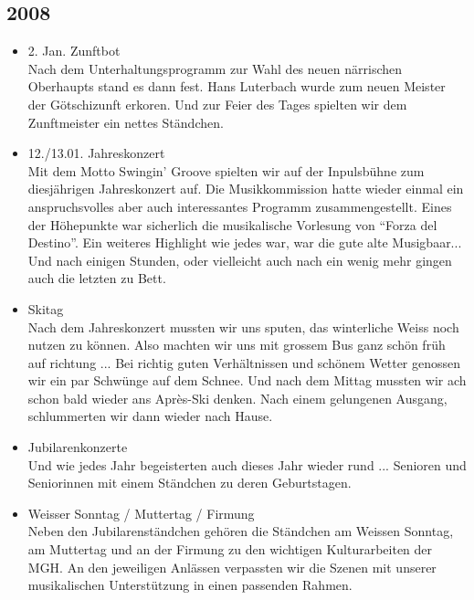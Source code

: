 \subsection*{2008}

\begin{history}


    \begin{itemize}

        \item 2. Jan. Zunftbot\\
              Nach dem Unterhaltungsprogramm zur Wahl des neuen närrischen Oberhaupts
              stand es dann fest. Hans Luterbach wurde zum neuen Meister der
              Götschizunft erkoren. Und zur Feier des Tages spielten wir dem
              Zunftmeister ein nettes Ständchen.

        \item 12./13.01. Jahreskonzert\\

              Mit dem Motto Swingin' Groove spielten wir auf der Inpulsbühne zum
              diesjährigen Jahreskonzert auf. Die Musikkommission hatte wieder einmal
              ein anspruchsvolles aber auch interessantes Programm zusammengestellt.
              Eines der Höhepunkte war sicherlich die musikalische Vorlesung von
              \enquote{Forza del Destino}. Ein weiteres Highlight wie jedes war, war
              die gute alte Musigbaar... Und nach einigen Stunden, oder vielleicht
              auch nach ein wenig mehr gingen auch die letzten zu Bett.

        \item Skitag\\
              Nach dem Jahreskonzert mussten wir uns sputen, das winterliche Weiss
              noch nutzen zu können. Also machten wir uns mit grossem Bus ganz schön
              früh auf richtung ... Bei richtig guten Verhältnissen und schönem Wetter
              genossen wir ein par Schwünge auf dem Schnee. Und nach dem Mittag
              mussten wir ach schon bald wieder ans Après-Ski denken. Nach einem
              gelungenen Ausgang, schlummerten wir dann wieder nach Hause.

        \item Jubilarenkonzerte\\
              Und wie jedes Jahr begeisterten auch dieses Jahr wieder rund ...
              Senioren und Seniorinnen mit einem Ständchen zu deren Geburtstagen.

        \item Weisser Sonntag / Muttertag / Firmung\\
              Neben den Jubilarenständchen gehören die Ständchen am Weissen Sonntag,
              am Muttertag und an der Firmung zu den wichtigen Kulturarbeiten der MGH.
              An den jeweiligen Anlässen verpassten wir die Szenen mit unserer
              musikalischen Unterstützung in einen passenden Rahmen.


\end{itemize}
\end{history}
